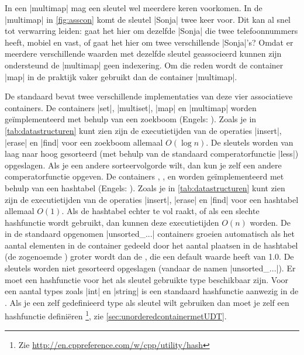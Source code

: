 \begin{cpplstShortInline}
In een |multimap| mag een sleutel wel meerdere keren voorkomen.
In de |multimap| in \cref{fig:asscon} komt de sleutel |Sonja| twee keer voor.
Dit kan al snel tot verwarring leiden: gaat het hier om dezelfde |Sonja| die twee telefoonnummers heeft, mobiel en vast, of gaat het hier om twee verschillende |Sonja|'s? 
Omdat er meerdere verschillende waarden met dezelfde sleutel geassocieerd kunnen zijn ondersteund de |multimap| geen indexering.
Om die reden wordt de container |map| in de praktijk vaker gebruikt dan de container |multimap|.

De standaard  bevat twee verschillende implementaties van deze vier associatieve containers.
De containers |set|, |multiset|, |map| en |multimap| worden geïmplementeerd met behulp van een zoekboom (Engels: ).
Zoals je in \cref{tab:datastructuren} kunt zien zijn de executietijden van de operaties |insert|, |erase| en |find| voor een zoekboom allemaal $O(\log{n})$.
De sleutels worden van laag naar hoog gesorteerd (met behulp van de standaard comperatorfunctie |less|) opgeslagen.
Als je een andere sorteervolgorde wilt, dan kun je zelf een andere comperatorfunctie opgeven.
De containers , ,  en  worden geïmplementeerd met behulp van een hashtabel (Engels: ).
Zoals je in \cref{tab:datastructuren} kunt zien zijn de executietijden van de operaties |insert|, |erase| en |find| voor een hashtabel allemaal $O(1)$.
Als de hashtabel echter te vol raakt, of als een slechte hashfunctie wordt gebruikt, dan kunnen deze executietijden $O(n)$ worden.
De in de standaard opgenomen |unsorted_...| containers groeien automatisch als het aantal elementen in de container gedeeld door het aantal plaatsen in de hashtabel (de zogenoemde ) groter wordt dan de , die een default waarde heeft van 1.0.
De sleutels worden niet gesorteerd opgeslagen (vandaar de namen |unsorted_...|).
Er moet een hashfunctie voor het als sleutel gebruikte type beschikbaar zijn.
Voor een aantal types zoals |int| en |string| is een standaard hashfunctie aanwezig in de .
Als je een zelf gedefinieerd type als sleutel wilt gebruiken dan moet je zelf een hashfunctie definiëren%
\footnote{%
	Zie \url{http://en.cppreference.com/w/cpp/utility/hash}%
}, zie \cref{sec:unorderedcontainermetUDT}.


\end{cpplstShortInline}
